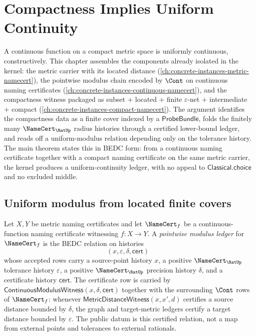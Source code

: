 \chapter{Compactness Implies Uniform Continuity}
\label{ch:visions-compact-uniform-continuity}

A continuous function on a compact metric space is uniformly continuous, constructively. This chapter assembles the components already isolated in the kernel: the metric carrier with its located distance (\autoref{ch:concrete-instances-metric-namecert}), the pointwise modulus chain encoded by $\Cont$ on continuous naming certificates (\autoref{ch:concrete-instances-continuous-namecert}), and the compactness witness packaged as subset $+$ located $+$ finite $\varepsilon$-net $+$ intermediate $+$ compact (\autoref{ch:concrete-instances-compact-namecert}). The argument identifies the compactness data as a finite cover indexed by a $\mathsf{ProbeBundle}$, folds the finitely many $\NameCert_{\RatUp}$ radius histories through a certified lower-bound ledger, and reads off a uniform-modulus relation depending only on the tolerance history. The main theorem states this in BEDC form: from a continuous naming certificate together with a compact naming certificate on the same metric carrier, the kernel produces a uniform-continuity ledger, with no appeal to $\mathsf{Classical.choice}$ and no excluded middle.

\section{Uniform modulus from located finite covers}
\label{sec:compact-uniform-continuity-uniform-modulus}

\begin{definition}
\label{def:compact-uniform-pointwise-modulus}
Let $X, Y$ be metric naming certificates and let $\NameCert_f$ be a continuous-function naming certificate witnessing $f \colon X \to Y$. A \emph{pointwise modulus ledger} for $\NameCert_f$ is the BEDC relation on histories
$$
(x,\varepsilon,\delta,\mathsf{cert})
$$
whose accepted rows carry a source-point history $x$, a positive $\NameCert_{\RatUp}$ tolerance history $\varepsilon$, a positive $\NameCert_{\RatUp}$ precision history $\delta$, and a certificate history $\mathsf{cert}$. The certificate row is carried by $\mathsf{ContinuousModulusWitness}(x,\delta,\mathsf{cert})$ together with the surrounding $\Cont$ rows of $\NameCert_f$: whenever $\mathsf{MetricDistanceWitness}(x,x',d)$ certifies a source distance bounded by $\delta$, the graph and target-metric ledgers certify a target distance bounded by $\varepsilon$. The public datum is this certified relation, not a map from external points and tolerances to external rationals.
\end{definition}

